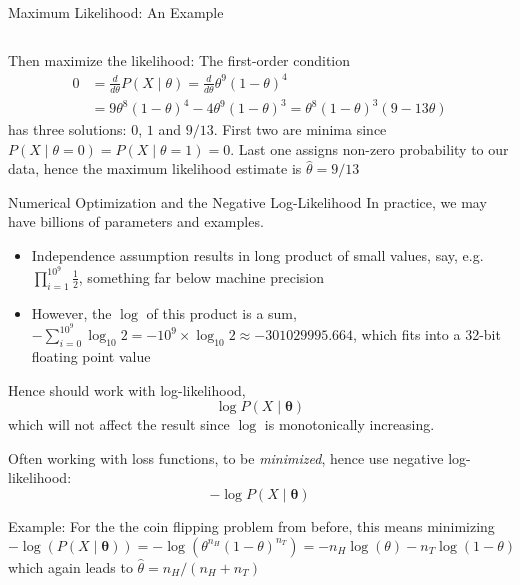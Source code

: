 {\begin{frame}{Maximum Likelihood: An Example}
\begin{columns}[onlytextwidth]
\begin{column}{0.3\textwidth}
            \end{column}
        \end{columns}
        Then maximize the likelihood: The first-order condition
        $$
            \begin{aligned}
                0 & = \frac{d}{d\theta} P(X \mid \theta)
                = \frac{d}{d\theta} \theta^9(1-\theta)^4            \\
                  & = 9\theta^8(1-\theta)^4 - 4\theta^9(1-\theta)^3
                = \theta^8(1-\theta)^3(9-13\theta)
            \end{aligned}
        $$
        has three solutions: $0$, $1$ and $9/13$. First two are minima since
        $P(X\mid \theta=0) = P(X\mid \theta=1) = 0$. Last one assigns non-zero probability
        to our data, hence the maximum likelihood estimate is $\hat \theta = 9/13$
    \end{frame}

    \begin{frame}{Numerical Optimization and the Negative Log-Likelihood}
        In practice, we may have billions of parameters and examples.
        \begin{itemize}
            \item Independence assumption results in long product of small values, say, e.g.
                  $\prod_{i=1}^{10^9} \frac12$, something far below machine precision
            \item However, the $\log$ of this product is a sum,
                  $-\sum_{i=0}^{10^9} \log_{10} 2 = -10^9 \times \log_{10} 2 \approx -301029995.664$,
                  which fits into a 32-bit floating point value
        \end{itemize}

        Hence should work with log-likelihood,
        $$\log P(X \mid \boldsymbol{\theta})$$
        which will not affect the result since $\log$ is monotonically increasing.

        Often working with loss functions, to be \emph{minimized}, hence use negative log-likelihood:
        $$-\log P(X \mid \boldsymbol{\theta})$$

        Example: For the the coin flipping problem from before, this means minimizing
        $$-\log(P(X \mid \boldsymbol{\theta})) = -\log(\theta^{n_H}(1-\theta)^{n_T}) = -n_H\log(\theta) - n_T\log(1-\theta)$$
        which again leads to $\hat{\theta} = n_H/(n_H + n_T)$
    \end{frame}

}

